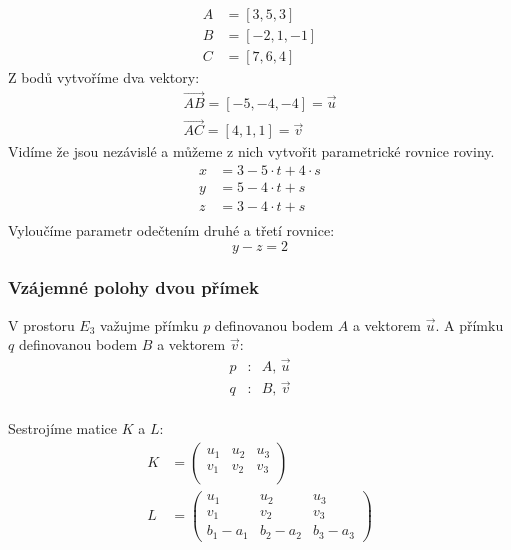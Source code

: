 \begin{example}
    \begin{align*}
        A &= [3, 5, 3]\\
        B &= [-2, 1, -1]\\
        C &= [7, 6, 4]
    \end{align*}
    Z bodů vytvoříme dva vektory:
    \begin{align*}
        \vec{AB} = [-5, -4, -4] = \vec{u}\\
        \vec{AC} = [4, 1, 1] = \vec{v}
    \end{align*}
    Vidíme že jsou nezávislé a můžeme z nich vytvořit parametrické rovnice roviny.
    \begin{align*}
        x &= 3 - 5 \cdot t + 4\cdot s\\
        y &= 5 - 4 \cdot t + s\\
        z &= 3 - 4 \cdot t + s\\
    \end{align*}
    Vyloučíme parametr odečtením druhé a třetí rovnice:
    $$y - z = 2$$
\end{example}

\subsubsection{Vzájemné polohy dvou přímek}
V prostoru $E_3$ važujme přímku $p$ definovanou bodem $A$ a vektorem $\vec{u}$. A
přímku $q$ definovanou bodem $B$ a vektorem $\vec{v}$:
\begin{align*}
    p&: \;\; A,\,\vec{u}\\
    q&: \;\; B,\,\vec{v}\\
\end{align*}

Sestrojíme matice $K$ a $L$:
\begin{align*}
    K &=
    \begin{pmatrix}
        u_1 & u_2 & u_3\\
        v_1 & v_2 & v_3\\
    \end{pmatrix}\\
    L &=
    \begin{pmatrix}
        u_1 & u_2 & u_3\\
        v_1 & v_2 & v_3\\
        b_1 - a_1 & b_2 - a_2 &  b_3 - a_3
    \end{pmatrix}
\end{align*}


